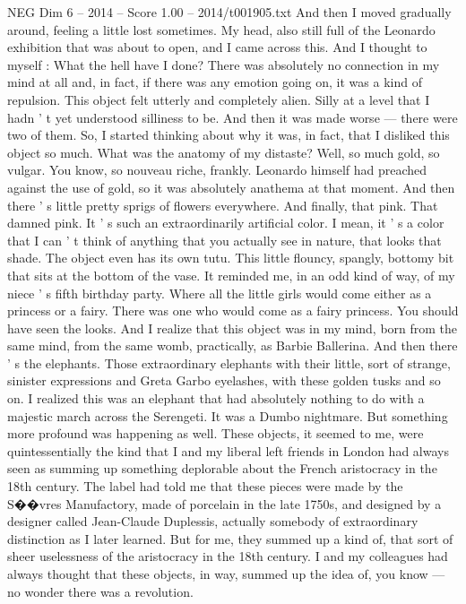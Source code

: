 \begin{textsample}{NEG Dim 6 – 2014 – Score 1.00 – 2014/t001905.txt}
And then I moved gradually around, feeling a little lost sometimes.
My head, also still full of the Leonardo exhibition that was about to open, and I came across this.
And I thought to myself : What the hell have I done?
There was absolutely no connection in my mind at all and, in fact, if there was any emotion going on, it was a kind of repulsion.
This object felt utterly and completely alien.
Silly at a level that I hadn ' t yet understood silliness to be.
And then it was made worse — there were two of them.
So, I started thinking about why it was, in fact, that I disliked this object so much.
What was the anatomy of my distaste?
Well, so much gold, so vulgar.
You know, so nouveau riche, frankly.
Leonardo himself had preached against the use of gold, so it was absolutely anathema at that moment.
And then there ' s little pretty sprigs of flowers everywhere.
And finally, that pink.
That damned pink.
It ' s such an extraordinarily artificial color.
I mean, it ' s a color that I can ' t think of anything that you actually see in nature, that looks that shade.
The object even has its own tutu.
This little flouncy, spangly, bottomy bit that sits at the bottom of the vase.
It reminded me, in an odd kind of way, of my niece ' s fifth birthday party.
Where all the little girls would come either as a princess or a fairy.
There was one who would come as a fairy princess.
You should have seen the looks.
And I realize that this object was in my mind, born from the same mind, from the same womb, practically, as Barbie Ballerina.
And then there ' s the elephants.
Those extraordinary elephants with their little, sort of strange, sinister expressions and Greta Garbo eyelashes, with these golden tusks and so on.
I realized this was an elephant that had absolutely nothing to do with a majestic march across the Serengeti.
It was a Dumbo nightmare.
But something more profound was happening as well.
These objects, it seemed to me, were quintessentially the kind that I and my liberal left friends in London had always seen as summing up something deplorable about the French aristocracy in the 18th century.
The label had told me that these pieces were made by the S{\EmojiFont �}{\EmojiFont �}vres Manufactory, made of porcelain in the late 1750s, and designed by a designer called Jean-Claude Duplessis, actually somebody of extraordinary distinction as I later learned.
But for me, they summed up a kind of, that sort of sheer uselessness of the aristocracy in the 18th century.
I and my colleagues had always thought that these objects, in way, summed up the idea of, you know — no wonder there was a revolution.

\end{textsample}
